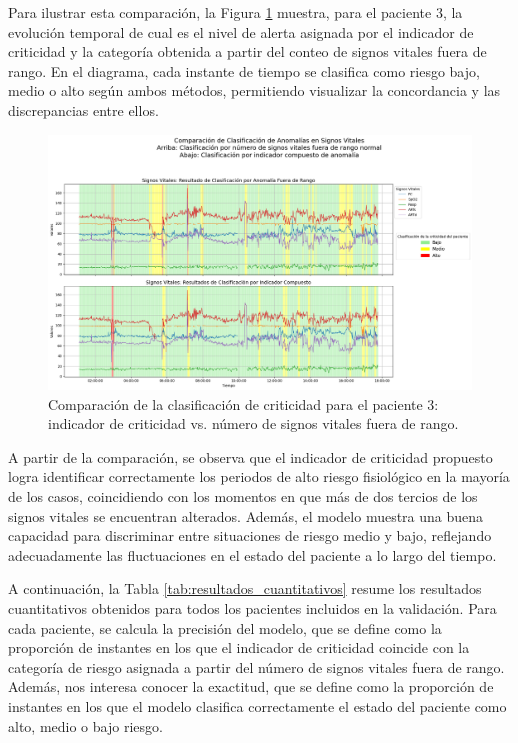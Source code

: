 Para ilustrar esta comparación, la Figura \ref{fig:comparacion_clasificacion_paciente3} muestra, para el paciente 3, la evolución temporal de cual es el nivel de alerta asignada por el indicador de criticidad y la categoría obtenida a partir del conteo de signos vitales fuera de rango. En el diagrama, cada instante de tiempo se clasifica como riesgo bajo, medio o alto según ambos métodos, permitiendo visualizar la concordancia y las discrepancias entre ellos.

\begin{figure}[H]
  \centering
  \includegraphics[width=\textwidth]{Images/comparacion_indicador_con_fuera_de_rango.png}
  \caption{Comparación de la clasificación de criticidad para el paciente 3: indicador de criticidad vs. número de signos vitales fuera de rango.}
  \label{fig:comparacion_clasificacion_paciente3}
\end{figure}

A partir de la comparación, se observa que el indicador de criticidad propuesto logra identificar correctamente los periodos de alto riesgo fisiológico en la mayoría de los casos, coincidiendo con los momentos en que más de dos tercios de los signos vitales se encuentran alterados. Además, el modelo muestra una buena capacidad para discriminar entre situaciones de riesgo medio y bajo, reflejando adecuadamente las fluctuaciones en el estado del paciente a lo largo del tiempo.

A continuación, la Tabla \ref{tab:resultados_cuantitativos} resume los resultados cuantitativos obtenidos para todos los pacientes incluidos en la validación. Para cada paciente, se calcula la precisión del modelo, que se define como la proporción de instantes en los que el indicador de criticidad coincide con la categoría de riesgo asignada a partir del número de signos vitales fuera de rango. Además, nos interesa conocer la exactitud, que se define como la proporción de instantes en los que el modelo clasifica correctamente el estado del paciente como alto, medio o bajo riesgo.

